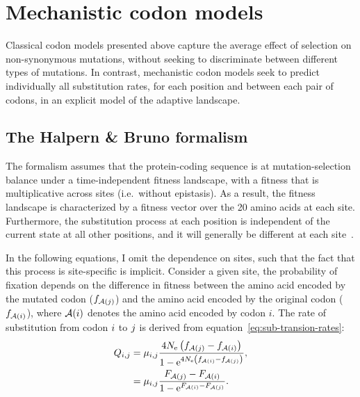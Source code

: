 \section{Mechanistic {codon} models}
\label{sec:intro-mechanistic-codon-models}

Classical \gls{codon} models presented above capture the average effect of selection on \gls{non-synonymous} mutations, without seeking to discriminate between different types of mutations.
In contrast, mechanistic \gls{codon} models seek to predict individually all \gls{substitution} rates, for each position and between each pair of \glspl{codon}, in an explicit model of the adaptive landscape.

\subsection{The Halpern \& Bruno formalism}
\label{subsec:HB-formalism}

The \citet{Halpern1998} formalism assumes that the protein-coding sequence is at mutation-selection balance under a time-independent fitness landscape, with a fitness that is multiplicative across sites (i.e.~without epistasis).
As a result, the fitness landscape is characterized by a fitness vector over the 20 amino acids at each site.
Furthermore, the \gls{substitution} process at each position is independent of the current state at all other positions, and it will generally be different at each site~\citep{Rodrigue2010, Tamuri2012}.

In the following equations, I omit the dependence on sites, such that the fact that this process is site-specific is implicit.
Consider a given site, the probability of fixation depends on the difference in fitness between the amino acid encoded by the mutated \gls{codon} ($f_{\mathcal{A}({j})}$) and the amino acid encoded by the original \gls{codon} ($f_{\mathcal{A}({i})}$), where $\mathcal{A}({i})$ denotes the amino acid encoded by \gls{codon} $i$.
The rate of \gls{substitution} from \gls{codon} ${i}$ to ${j}$ is derived from equation~\ref{eq:sub-transion-rates}:
\begin{align}
    Q_{{i}, {j}} & = \mu_{{i}, {j}} \dfrac{4 N_{\text{e}} \left({f_{\mathcal{A}({j})} - f_{\mathcal{A}({i})}}\right)}{{1 - \text{e}^{4 N_{\text{e}} \left({f_{\mathcal{A}({i})} - f_{\mathcal{A}({j})}}\right)} }}, \\
    & = \mu_{{i}, {j}} \dfrac{F_{\mathcal{A}({j})} - F_{\mathcal{A}({i})}}{1 - \text{e}^{F_{\mathcal{A}({i})} - F_{\mathcal{A}({j})}} }.
\end{align}

